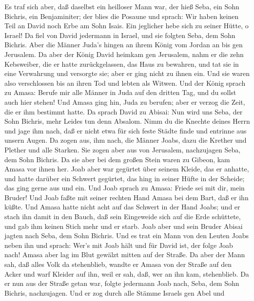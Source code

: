  Es traf sich aber, daß daselbst ein heilloser Mann war, der
hieß Seba, ein Sohn Bichris, ein Benjaminiter; der blies die Posaune und
sprach: Wir haben keinen Teil an David noch Erbe am Sohn Isais. Ein
jeglicher hebe sich zu seiner Hütte, o Israel!  Da fiel von
David jedermann in Israel, und sie folgten Seba, dem Sohn Bichris. Aber
die Männer Juda's hingen an ihrem König vom Jordan an bis gen Jerusalem.
 Da aber der König David heimkam gen Jerusalem, nahm er die
zehn Kebsweiber, die er hatte zurückgelassen, das Haus zu bewahren, und
tat sie in eine Verwahrung und versorgte sie; aber er ging nicht zu
ihnen ein. Und sie waren also verschlossen bis an ihren Tod und lebten
als Witwen.  Und der König sprach zu Amasa: Berufe mir alle
Männer in Juda auf den dritten Tag, und du sollst auch hier stehen!
 Und Amasa ging hin, Juda zu berufen; aber er verzog die
Zeit, die er ihm bestimmt hatte.  Da sprach David zu Abisai:
Nun wird uns Seba, der Sohn Bichris, mehr Leides tun denn Absalom. Nimm
du die Knechte deines Herrn und jage ihm nach, daß er nicht etwa für
sich feste Städte finde und entrinne aus unsern Augen.  Da
zogen aus, ihm nach, die Männer Joabs, dazu die Krether und Plether und
alle Starken. Sie zogen aber aus von Jerusalem, nachzujagen Seba, dem
Sohn Bichris.  Da sie aber bei dem großen Stein waren zu
Gibeon, kam Amasa vor ihnen her. Joab aber war gegürtet über seinem
Kleide, das er anhatte, und hatte darüber ein Schwert gegürtet, das hing
in seiner Hüfte in der Scheide; das ging gerne aus und ein. 
Und Joab sprach zu Amasa: Friede sei mit dir, mein Bruder! Und Joab
faßte mit seiner rechten Hand Amasa bei dem Bart, daß er ihn küßte.
 Und Amasa hatte nicht acht auf das Schwert in der Hand
Joabs; und er stach ihn damit in den Bauch, daß sein Eingeweide sich auf
die Erde schüttete, und gab ihm keinen Stich mehr und er starb. Joab
aber und sein Bruder Abisai jagten nach Seba, dem Sohn Bichris.
 Und es trat ein Mann von den Leuten Joabs neben ihn und
sprach: Wer's mit Joab hält und für David ist, der folge Joab nach!
 Amasa aber lag im Blut gewälzt mitten auf der Straße. Da
aber der Mann sah, daß alles Volk da stehenblieb, wandte er Amasa von
der Straße auf den Acker und warf Kleider auf ihn, weil er sah, daß, wer
an ihn kam, stehenblieb.  Da er nun aus der Straße getan
war, folgte jedermann Joab nach, Seba, dem Sohn Bichris, nachzujagen.
 Und er zog durch alle Stämme Israels gen Abel und
